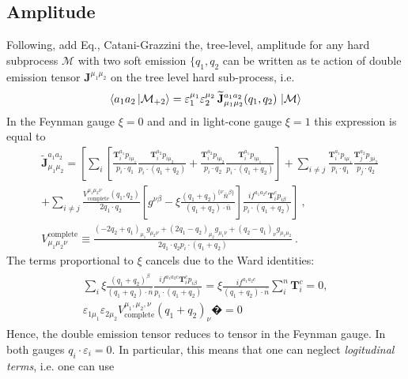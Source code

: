 \documentclass[a4paper,11pt]{article}
\numberwithin{equation}{section}
\newcommand{\bJ}{\mathbf{J}}
\newcommand{\bT}{\mathbf{T}}
\newcommand{\ldot}{\!\cdot\!}
\newcommand{\pola}{\varepsilon}
\begin{document}
\subsection{Amplitude}
Following, add Eq., Catani-Grazzini the, tree-level, amplitude for any hard subprocess $\mathcal{M}$ with 
two soft emission $\{q_1,q_2$ can be written as te action of double emission tensor  $ \bJ^{\mu_1\mu_2}$ on the tree level hard sub-process, i.e.
\begin{align}
\langle a_1 a_2\ket{\mathcal{M}_{+2}}  = \pola_1^{\mu_1} \pola_2^{\mu_2}\, \widetilde{\bJ}_{\mu_1\mu_2}^{a_1a_2} (q_1,q_2)\, \ket{\mathcal{M}} 
\end{align}
In the Feynman gauge $\xi=0$ and and in light-cone gauge $\xi=1$ this expression is equal to 
\begin{align*}
&\widetilde{\bJ}_{\mu_1\mu_2}^{a_1a_2}= \left[ \sum_{i} \left[
\frac{\bT_i^{a_1} p_{i\mu_1}}{p_i \ldot q_1}  
\frac{\bT_i^{a_2} p_{i \mu_2}}{p_i \ldot (q_1+q_2)} +
\frac{\bT_i^{a_2} p_{i\mu_2}}{p_i \ldot q_2}  
\frac{\bT_i^{a_1} p_{i \mu_1}}{p_i \ldot (q_1+q_2)} \right]
+
\sum_{i\ne j}\frac{\bT_i^{a_1} p_{i\mu_1}}{p_i \ldot q_1}  
\frac{\bT_j^{a_2} p_{j \mu_2}}{p_j \ldot q_2}\right.
\\&
\left.+  \sum_{i\ne j}  \frac{ V_{\text{complete}}^{\mu_1\mu_2\nu}(q_1,q_2) }{2q_1\ldot q_2  \,} \left[ g^{\nu\beta}- 
\xi \frac{(q_1+q_2)^{\{ \nu} \bar{n}^{\beta\}}}{(q_1+q_2) \cdot \bar{n}} \right]
\frac{ if^{a_1a_2c} \bT_i^{c} p_{i\beta} }{p_i \ldot (q_1+q_2)} \right]   ~,\\
&V^{\text{complete}}_{\mu_1\mu_2\nu} \equiv \frac{(-2q_2+q_1)_{\mu_1}g_{\mu_2\nu}+(2q_1-q_2)_{\mu_2}g_{\mu_1\nu}
+(q_2-q_1)_\nu g_{\mu_1\mu_2} }{2q_1\ldot q_2  p_i \cdot (q_1+q_2) }~.
\end{align*}
The terms proportional to $\xi$ cancels due to the Ward identities:
\begin{align}
\begin{gathered}
\sum_i \xi \frac{(q_1+q_2)^{ \beta} }{(q_1+q_2) \cdot \bar{n}} 
\frac{ if ^{a_1a_2c} \bT_i^{c} p_{i\beta} }{p_i \ldot (q_1+q_2)}=
\xi\frac{   if ^{a_1a_2c}  }{(q_1+q_2) \cdot \bar{n}} 
  \sum_i^n \bT_i^{c}  =0, \\
\pola_{1\mu_1} \pola_{2\mu_2} V_{\text{complete}}^{\mu_1,\mu_2,\nu} (q_1+q_2)_\nu�=0
\end{gathered}
\end{align}
Hence, the double emission tensor reduces to tensor in the Feynman gauge. In both gauges $q_i\ldot \pola_i=0$. In particular, this means that one can neglect \emph{logitudinal terms}, i.e. one can use 
\end{document}
